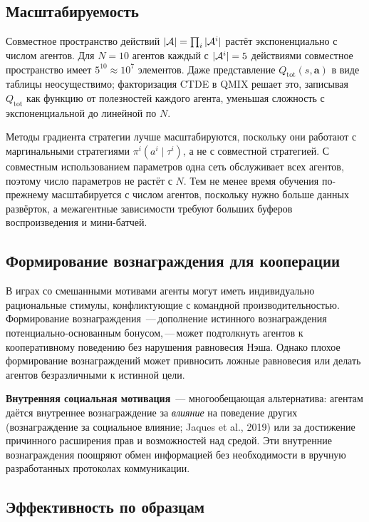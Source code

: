 \subsection{Масштабируемость}

Совместное пространство действий $|\mathcal{A}| = \prod_i |\mathcal{A}^i|$ растёт экспоненциально
с числом агентов. Для $N = 10$ агентов каждый с $|\mathcal{A}^i| = 5$
действиями совместное пространство имеет $5^{10} \approx 10^7$ элементов. Даже
представление $Q_\mathrm{tot}(s, \bm{a})$ в виде таблицы неосуществимо;
факторизация CTDE в QMIX решает это, записывая
$Q_\mathrm{tot}$ как функцию от полезностей каждого агента, уменьшая
сложность с экспоненциальной до линейной по $N$.

Методы градиента стратегии лучше масштабируются, поскольку они работают с
маргинальными стратегиями $\pi^i(a^i \mid \tau^i)$, а не с совместной
стратегией. С совместным использованием параметров одна сеть обслуживает всех агентов,
поэтому число параметров не растёт с $N$. Тем не менее
время обучения по-прежнему масштабируется с числом агентов, поскольку нужно больше
данных развёрток, а межагентные зависимости требуют больших
буферов воспроизведения и мини-батчей.

\subsection{Формирование вознаграждения для кооперации}

В играх со смешанными мотивами агенты могут иметь индивидуально рациональные
стимулы, конфликтующие с командной производительностью. Формирование вознаграждения
\,---\,дополнение истинного вознаграждения
потенциально-основанным бонусом,\,---\,может подтолкнуть агентов к
кооперативному поведению без нарушения равновесия Нэша.
Однако плохое формирование вознаграждений может привносить ложные равновесия
или делать агентов безразличными к истинной цели.

\textbf{Внутренняя социальная мотивация}~---
многообещающая альтернатива: агентам даётся внутреннее вознаграждение
за \emph{влияние} на поведение других (вознаграждение за социальное влияние;
Jaques et al., 2019) или за достижение причинного расширения прав и возможностей
над средой. Эти внутренние вознаграждения поощряют обмен информацией
без необходимости в вручную разработанных протоколах коммуникации.

\subsection{Эффективность по образцам}

